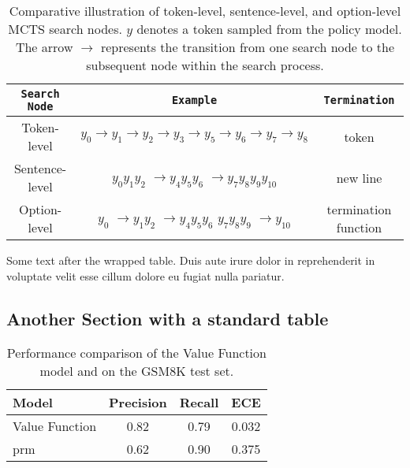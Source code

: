 \documentclass{article}
\begin{document}
\begin{table}[!htb]
\footnotesize
    \centering
    \setlength{\tabcolsep}{4pt}
    \begin{tabular}{c|c|c}

    \toprule
    \texttt{Search Node} & \texttt{Example} & \texttt{Termination}  \\
    \midrule
    Token-level & $y_0 \rightarrow y_1 \rightarrow y_2 \rightarrow y_3 \rightarrow y_5 \rightarrow y_6 \rightarrow y_7 \rightarrow y_8$ &  token\\
    \midrule
    Sentence-level & $y_0 y_1 y_2$ \enterkey{}  $\rightarrow y_4 y_5 y_6$ \enterkey{} $\rightarrow y_7 y_8 y_9 y_{10}$ & new line\\
    \midrule
    Option-level & $y_0$  $\rightarrow y_1 y_2$ \enterkey{} $\rightarrow y_4 y_5 y_6$ \enterkey{} $y_7 y_8 y_9$ \enterkey{} $\rightarrow y_{10}$& termination function\\
    \bottomrule
    \end{tabular}
    \vspace{2mm}
    \caption{Comparative illustration of token-level, sentence-level, and option-level MCTS search nodes. $y$ denotes a token sampled from the policy model. The arrow $\rightarrow$ represents the transition from one search node to the subsequent node within the search process.}
    \label{tab:option}
\end{table}


Some text after the wrapped table. Duis aute irure dolor in reprehenderit in voluptate velit esse cillum dolore eu fugiat nulla pariatur.

\subsection{Another Section with a standard table}
\begin{table}[!htb]
    \centering
    \begin{tabular}{l|c|c|c}
        Model               & Precision & Recall & ECE \\
        \hline
        Value Function      & 0.82      & 0.79   & 0.032 \\
        prm              & 0.62      & 0.90   & 0.375 \\
        \hline
    \end{tabular}
    \vspace{4mm}
    \caption{Performance comparison of the Value Function model and \prm{} on the GSM8K test set.}
    \label{table:ablation_critic_example}
\end{table}
\end{document}
